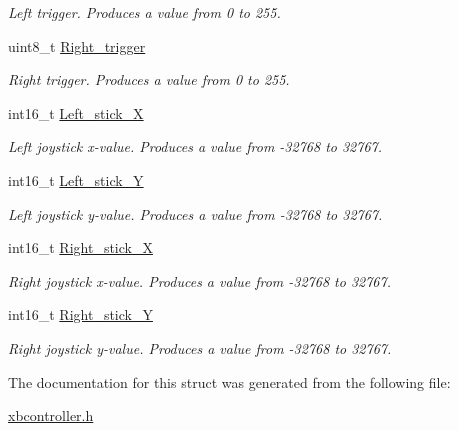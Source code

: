 \begin{DoxyCompactItemize}
\begin{DoxyCompactList}\small\item\em Left trigger. Produces a value from 0 to 255. \end{DoxyCompactList}\item 
\hypertarget{structButtons_a0c4ea3c75c338e66f8cfb3517de5a70c}{uint8\-\_\-t \hyperlink{structButtons_a0c4ea3c75c338e66f8cfb3517de5a70c}{Right\-\_\-trigger}}\label{structButtons_a0c4ea3c75c338e66f8cfb3517de5a70c}

\begin{DoxyCompactList}\small\item\em Right trigger. Produces a value from 0 to 255. \end{DoxyCompactList}\item 
\hypertarget{structButtons_ac06cd7aa5775e51bf0573bcf6ada08af}{int16\-\_\-t \hyperlink{structButtons_ac06cd7aa5775e51bf0573bcf6ada08af}{Left\-\_\-stick\-\_\-\-X}}\label{structButtons_ac06cd7aa5775e51bf0573bcf6ada08af}

\begin{DoxyCompactList}\small\item\em Left joystick x-\/value. Produces a value from -\/32768 to 32767. \end{DoxyCompactList}\item 
\hypertarget{structButtons_a84fd5bc1ce125d608db39901094e0fb6}{int16\-\_\-t \hyperlink{structButtons_a84fd5bc1ce125d608db39901094e0fb6}{Left\-\_\-stick\-\_\-\-Y}}\label{structButtons_a84fd5bc1ce125d608db39901094e0fb6}

\begin{DoxyCompactList}\small\item\em Left joystick y-\/value. Produces a value from -\/32768 to 32767. \end{DoxyCompactList}\item 
\hypertarget{structButtons_ac1897ab282fc81e9255ab2176ad8c9e2}{int16\-\_\-t \hyperlink{structButtons_ac1897ab282fc81e9255ab2176ad8c9e2}{Right\-\_\-stick\-\_\-\-X}}\label{structButtons_ac1897ab282fc81e9255ab2176ad8c9e2}

\begin{DoxyCompactList}\small\item\em Right joystick x-\/value. Produces a value from -\/32768 to 32767. \end{DoxyCompactList}\item 
\hypertarget{structButtons_ac3454701734840f55fef69fd11e74964}{int16\-\_\-t \hyperlink{structButtons_ac3454701734840f55fef69fd11e74964}{Right\-\_\-stick\-\_\-\-Y}}\label{structButtons_ac3454701734840f55fef69fd11e74964}

\begin{DoxyCompactList}\small\item\em Right joystick y-\/value. Produces a value from -\/32768 to 32767. \end{DoxyCompactList}\end{DoxyCompactItemize}


The documentation for this struct was generated from the following file\-:\begin{DoxyCompactItemize}
\item 
\hyperlink{xbcontroller_8h}{xbcontroller.\-h}\end{DoxyCompactItemize}
